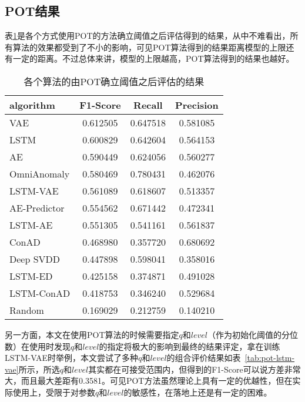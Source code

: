 \subsection{POT结果}
表\ref{tab:POT}是各个方式使用POT的方法确立阈值之后评估得到的结果，从中不难看出，所有算法的效果都受到了不小的影响，可见POT算法得到的结果距离模型的上限还有一定的距离。不过总体来讲，模型的上限越高，POT算法得到的结果也越好。

\begin{table}[htbp]
  \centering
  \begin{tabular}{lccc}
    \toprule
            algorithm &  F1-Score &    Recall &  Precision \\
    \midrule
          VAE &  0.612505 &  0.647518 &   0.581085 \\
        LSTM &  0.600829 &  0.642604 &   0.564153 \\
                   AE &  0.590449 &  0.624056 &   0.560277 \\
          OmniAnomaly &  0.580469 &  0.780431 &   0.462076 \\
          LSTM-VAE &  0.561089 &  0.618607  & 0.513357 \\
         AE-Predictor &  0.554562 &  0.671442 &   0.472341 \\
             LSTM-AE &  0.551305 &  0.541161 &   0.561837 \\
                ConAD &  0.468980 &  0.357720 &   0.680692 \\
            Deep SVDD &  0.447898 &  0.598041 &   0.358016 \\
              LSTM-ED &  0.425158 &  0.374871 &   0.491028 \\
           LSTM-ConAD &  0.418753 &  0.346240 &   0.529684 \\
               Random &  0.169029 &  0.212759 &   0.140210 \\
    \bottomrule
    \end{tabular}
    \caption{各个算法的由POT确立阈值之后评估的结果}
    \label{tab:POT}
\end{table}

另一方面，本文在使用POT算法的时候需要指定$q$和$level$（作为初始化阈值的分位数）在使用时发现$q$和$level$的指定将极大的影响到最终的结果评定，拿在训练LSTM-VAE时举例，本文尝试了多种$q$和$level$的组合评价结果如表~\ref{tab:pot-lstm-vae}所示，所选$q$和$level$其实都在可接受范围内，但得到的F1-Score可以说方差非常大，而且最大差距有0.3581。可见POT方法虽然理论上具有一定的优越性，但在实际使用上，受限于对参数$q$和$level$的敏感性，在落地上还是有一定的困难。

